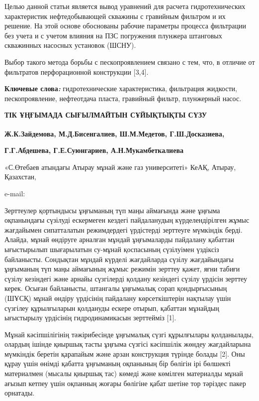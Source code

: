 Целью данной статьи является вывод уравнений для расчета
гидротехнических характеристик нефтедобывающей скважины с гравийным
фильтром и их решение. На этой основе обоснованы рабочие параметры
процесса фильтрации без учета и с учетом влияния на ПЗС погружения
плунжера штанговых скважинных насосных установок (ШСНУ).

Выбор такого метода борьбы с пескопроявлением связано с тем, что, в
отличие от фильтратов перфорационной конструкции {[}3,4{]}.

{\bfseries Ключевые слова\emph{:}} гидротехнические характеристика,
фильтрация жидкости, пескопроявление, нефтеотдача пласта, гравийный
фильтр, плунжерный насос.

{\bfseries ТІК ҰҢҒЫМАДА СЫҒЫЛМАЙТЫН СҰЙЫҚТЫҚТЫ СҮЗУ}

{\bfseries Ж.К.Зайдемова, М.Д.Бисенгалиев\textsuperscript{\envelope }, Ш.М.Медетов,
Г.Ш.Досказиева,}

{\bfseries Г.Г.Абдешева, Г.Е.Суюнгариев, А.Н.Мукамбеткалиева}

«С.Өтебаев атындағы Атырау мұнай және газ университеті» КеАҚ, Атырау,
Қазахстан,

e-mail:
\href{mailto:maks_bisengali@mail.ru}{}

Зерттеулер қортындысы ұңғыманың түп маңы аймағында және ұңғыма
оқпанындағы сүзілуді ескермеген кездегі пайдаланудың күрделендірілген
жұмыс жағдайымен сипатталатын режимдердегі үрдістерді зерттеуге
мүмкіндік берді. Алайда, мұнай өндіруге арналған мұндай ұңғымаларды
пайдалану қабаттан ығыстырылып шығарылатын су-мұнай қоспасының
сүзілуімен үздіксіз байланысты. Сондықтан мұндай күрделі жағдайларда
сүзілу жағдайындағы ұңғыманың түп маңы аймағының жұмыс режимін зерттеу
қажет, яғни табиғи сүзілу кезіндегі және арнайы сүзгілерді қолдану
кезіндегі сүзілу үрдісін зерттеу керек. Осыған байланысты, штангалы
ұңғымалық сорап қондырғысының (ШҰСҚ) мұнай өндіру үрдісінің пайдалану
көрсеткіштерін нақтылау үшін сүзгілеу құрылғыларын қолдануды ескере
отырып, қабаттан мұнайдың ығыстырылу үрдісінің гидродинамикасын
зерттейміз {[}1{]}.

Мұнай кәсіпшілігінің тәжірибесінде ұңғымалық сүзгі құрылғылары
қолданылады, олардың ішінде қиыршық тасты ұңғыма сүзгісі кәсіпшілік
жөндеу жағдайларына мүмкіндік беретін қарапайым және арзан конструкция
түрінде болады {[}2{]}. Оны құрау үшін өнімді қабатта ұңғыманың
оқпанының бір бөлігін ірі бөлшекті материалмен (мысалы қиыршық тас)
көмеді және көмілген материалды мұнай ағызып кетпеу үшін оқпанның жоғары
бөлігіне қабат шетіне тор тәріздес пакер орнатады.

